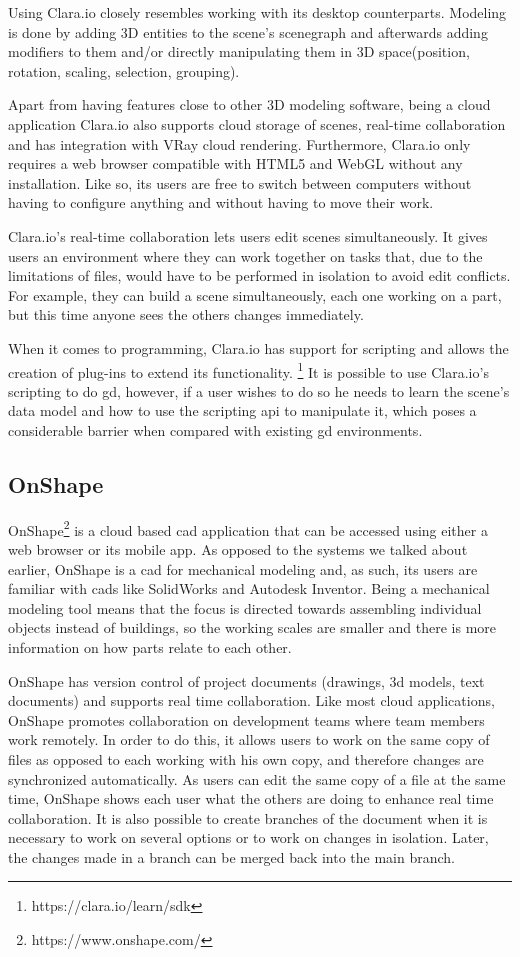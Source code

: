 Using Clara.io closely resembles working with its desktop counterparts.
Modeling is done by adding 3D entities to the scene's scenegraph and afterwards adding modifiers to them and/or directly manipulating them in 3D space(position, rotation, scaling, selection, grouping).

Apart from having features close to other 3D modeling software, being a cloud application Clara.io also supports cloud storage of scenes, real-time collaboration and has integration with VRay cloud rendering.
Furthermore, Clara.io only requires a web browser compatible with HTML5 and WebGL without any installation.
Like so, its users are free to switch between computers without having to configure anything and without having to move their work.

Clara.io's real-time collaboration lets users edit scenes simultaneously.
It gives users an environment where they can work together on tasks that, due to the limitations of files, would have to be performed in isolation to avoid edit conflicts.
For example, they can build a scene simultaneously, each one working on a part, but this time anyone sees the others changes immediately.

When it comes to programming, Clara.io has support for scripting and allows the creation of plug-ins to extend its functionality.%
\footnote{https://clara.io/learn/sdk}
It is possible to use Clara.io's scripting to do \gls{gd}, however, if a user wishes to do so he needs to learn the scene's data model and how to use the scripting \gls{api} to manipulate it, which poses a considerable barrier when compared with existing \gls{gd} environments.


\subsection{OnShape}
OnShape\footnote{https://www.onshape.com/} is a cloud based \gls{cad} application that can be accessed using either a web browser or its mobile app.
As opposed to the systems we talked about earlier, OnShape is a \gls{cad} for mechanical modeling and, as such, its users are familiar with \glspl{cad} like SolidWorks and Autodesk Inventor.
Being a mechanical modeling tool means that the focus is directed towards assembling individual objects instead of buildings, so the working scales are smaller and there is more information on how parts relate to each other.

OnShape has version control of project documents (drawings, 3d models, text documents) and supports real time collaboration.
Like most cloud applications, OnShape promotes collaboration on development teams where team members work remotely.
In order to do this, it allows users to work on the same copy of files as opposed to each working with his own copy, and therefore changes are synchronized automatically.
As users can edit the same copy of a file at the same time, OnShape shows each user what the others are doing to enhance real time collaboration.
It is also possible to create branches of the document when it is necessary to work on several options or to work on changes in isolation.
Later, the changes made in a branch can be merged back into the main branch.

